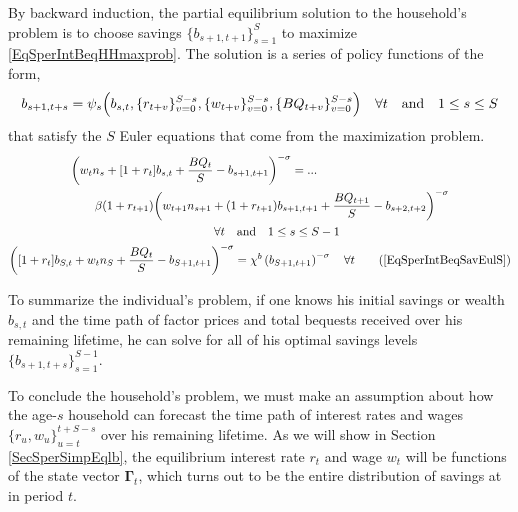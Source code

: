 \documentclass[letterpaper,12pt]{article}
\theoremstyle{definition}
\numberwithin{equation}{section}
\numberwithin{exercise}{section}
\begin{document}
\begin{spacing}{1.5}
      By backward induction, the partial equilibrium solution to the household's problem is to choose savings $\{b_{s+1,t+1}\}_{s=1}^S$ to maximize \eqref{EqSperIntBeqHHmaxprob}. The solution is a series of policy functions of the form,
      \begin{equation}\label{EqIntBeqSavPolFuncGen}
         b_{s+1,t+s} = \psi_s\Bigl(b_{s,t},\{r_{t+v}\}_{v=0}^{S-s},\{w_{t+v}\}_{v=0}^{S-s},\{BQ_{t+v}\}_{v=0}^{S-s}\Bigr) \quad\forall t \quad\text{and}\quad 1\leq s\leq S
      \end{equation}
      that satisfy the $S$ Euler equations that come from the maximization problem.
      \begin{gather}
         \begin{split}
            &\biggl(w_t n_{s} + [1 + r_{t}]b_{s,t} + \frac{BQ_t}{S} - b_{s+1,t+1}\biggr)^{-\sigma} = ... \\
            &\qquad \beta(1+r_{t+1})\biggl(w_{t+1}n_{s+1} + (1 + r_{t+1})b_{s+1,t+1} + \frac{BQ_{t+1}}{S} - b_{s+2,t+2}\biggr)^{-\sigma} \\
            &\qquad\qquad\qquad\qquad\qquad\qquad\forall t \quad\text{and}\quad 1\leq s\leq S-1
         \end{split} \label{EqIntBeqSavEulGen} \\
         \biggl([1+r_t]b_{S,t} + w_t n_S + \frac{BQ_t}{S} - b_{S+1,t+1}\biggr)^{-\sigma} = \chi^b\left(b_{S+1,t+1}\right)^{-\sigma} \quad\forall t \tag{\ref{EqSperIntBeqSavEulS}}
      \end{gather}

      To summarize the individual's problem, if one knows his initial savings or wealth $b_{s,t}$ and the time path of factor prices and total bequests received over his remaining lifetime, he can solve for all of his optimal savings levels $\{b_{s+1,t+s}\}_{s=1}^{S-1}$.

      To conclude the household's problem, we must make an assumption about how the age-$s$ household can forecast the time path of interest rates and wages $\{r_u, w_u\}_{u=t}^{t+S-s}$ over his remaining lifetime. As we will show in Section \ref{SecSperSimpEqlb}, the equilibrium interest rate $r_t$ and wage $w_t$ will be functions of the state vector $\bm{\Gamma}_t$, which turns out to be the entire distribution of savings at in period $t$.


\end{spacing}
\end{document}
